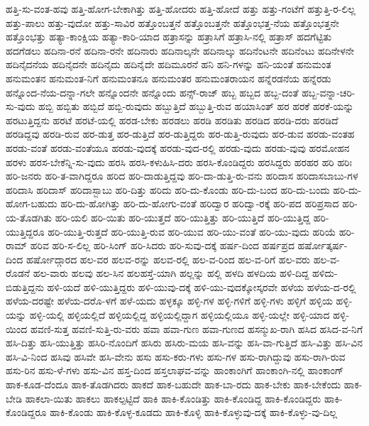 {ಹತ್ತಿ-ಸು-ವಂತ-ಹವು
ಹತ್ತಿ-ಹೋಗ-ಬೇಕಾಗಿತ್ತು
ಹತ್ತಿ-ಹೋದರು
ಹತ್ತಿ-ಹೋದೆ
ಹತ್ತು
ಹತ್ತು-ಗಂಟೆಗೆ
ಹತ್ತುತ್ತಿ-ರ-ಲಿಲ್ಲ
ಹತ್ತು-ಪಾಲು
ಹತ್ತು-ವುದೋ
ಹತ್ತು-ಸಾವಿರ
ಹತ್ತೊಂಬತ್ತನೆ
ಹತ್ತೊಂಬತ್ತನೇ
ಹತ್ತೊಂಭತ್ತ-ನೆಯ
ಹತ್ತೊಂಭತ್ತನೇ
ಹತ್ತೊಂಭತ್ತು
ಹತ್ಯಾ-ಕಾಂಕ್ಷಿಯ
ಹತ್ಯಾ-ಕಾರಿ-ಯಾದ
ಹತ್ರಾಸನ್ನು
ಹತ್ರಾಸಿಗೆ
ಹತ್ರಾಸಿ-ನಲ್ಲಿ
ಹತ್ರಾಸ್
ಹದಗೆಟ್ಟಿತು
ಹದಗೆಡಲು
ಹದಿನಾ-ರನೆ
ಹದಿನಾ-ರನೇ
ಹದಿನಾರು
ಹದಿನಾಲ್ಕನೇ
ಹದಿನಾಲ್ಕು
ಹದಿನೆಂಟನೇ
ಹದಿನೆಂಟು
ಹದಿನೇಳನೇ
ಹದಿನೈದನೆಯ
ಹದಿನೈದನೇ
ಹದಿನೈದು
ಹದಿನೈದೇ
ಹದಿಮೂರನೆ
ಹನಿ
ಹನಿ-ಗಳನ್ನು
ಹನಿ-ಯಂತೆ
ಹನುಮಂತ
ಹನುಮಂತನ
ಹನುಮಂತ-ನಿಗೆ
ಹನುಮಂತನೂ
ಹನುಮಂತರ
ಹನುಮಂತರಾಯನ
ಹನ್ನೆರಡನೆಯ
ಹನ್ನೆರಡು
ಹನ್ನೊಂದ-ನೆಯ-ದನ್ನಾ-ಗಲೇ
ಹನ್ನೊಂದನೇ
ಹನ್ನೊಂದು
ಹನ್ಸ್-ರಾಜ್
ಹಬ್ಬ
ಹಬ್ಬದ
ಹಬ್ಬ-ದಂತೆ
ಹಬ್ಬ-ವನ್ನಾ-ಚರಿ-ಸು-ವುದು
ಹಬ್ಬಿ
ಹಬ್ಬಿತು
ಹಬ್ಬಿದೆ
ಹಬ್ಬಿ-ರುವುದು
ಹಬ್ಬುತ್ತಿದೆ
ಹಬ್ಬುತ್ತಿ-ರುವ
ಹಯಾಸಿಂತ್
ಹರ
ಹರಕೆ
ಹರಕೆ-ಯನ್ನು
ಹರಟುತ್ತಿದ್ದನು
ಹರಟೆ
ಹರಟೆ-ಯಲ್ಲಿ
ಹರಡ-ಬೇಕು
ಹರಡಲು
ಹರಡಿ
ಹರಡಿತು
ಹರಡಿದ
ಹರಡಿ-ದರು
ಹರಡಿದೆ
ಹರಡಿದ್ದವು
ಹರಡಿ-ರುವ
ಹರ-ಡುತ್ತ
ಹರ-ಡುತ್ತಿದೆ
ಹರ-ಡುತ್ತಿದ್ದರು
ಹರ-ಡುತ್ತಿ-ರುವುದು
ಹರ-ಡುವ
ಹರಡು-ವಂತಹ
ಹರಡು-ವಂತೆ
ಹರಡು-ವಂತೆಯೂ
ಹರಡು-ವುದಕ್ಕೆ
ಹರಡು-ವುದ-ರಲ್ಲಿ
ಹರಡು-ವುದು
ಹರಡು-ವುವು
ಹರಮೋಹನ
ಹರಳು
ಹರಸ-ಬೇಕೆನ್ನಿ-ಸು-ವುದು
ಹರಸಿ
ಹರಸಿ-ಕಳುಹಿಸಿ-ದರು
ಹರಸಿ-ಕೊಂಡಿದ್ದರು
ಹರಸಿದ್ದರು
ಹರಹರ
ಹರಿ
ಹರಿಃ
ಹರಿ-ಜನರು
ಹರಿ-ತ-ವಾಗಿದ್ದರೂ
ಹರಿದ
ಹರಿ-ದಾಡುತ್ತಿದ್ದವು
ಹರಿ-ದಾ-ಡುತ್ತಿ-ರು-ವನು
ಹರಿದಾಸ
ಹರಿದಾಸಬಾಬು-ಗಳ
ಹರಿದಾಸಿ
ಹರಿದಾಸ್
ಹರಿದಾಸ್ಬಾಬು
ಹರಿ-ದಿತ್ತು
ಹರಿದು
ಹರಿ-ದು-ಕೊಂಡು
ಹರಿ-ದು-ಬಂದ
ಹರಿ-ದು-ಬಂದು
ಹರಿ-ದು-ಹೋಗ-ಬಹುದು
ಹರಿ-ದು-ಹೋಗಿತ್ತು
ಹರಿ-ದು-ಹೋಗು-ವಂತೆ
ಹರಿದ್ವಾರ
ಹರಿದ್ವಾ-ರಕ್ಕೆ
ಹರಿ-ಪದ
ಹರಿಪ್ರಸಾದ
ಹರಿ-ಯ-ತೊಡಗಿತು
ಹರಿ-ಯಲಿ
ಹರಿ-ಯಿತು
ಹರಿ-ಯುತ್ತದೆ
ಹರಿ-ಯುತ್ತಿತ್ತು
ಹರಿ-ಯುತ್ತಿದೆ
ಹರಿ-ಯುತ್ತಿದ್ದ
ಹರಿ-ಯುತ್ತಿದ್ದರೂ
ಹರಿ-ಯುತ್ತಿ-ರುತ್ತದೆ
ಹರಿ-ಯುತ್ತಿ-ರುವ
ಹರಿ-ಯುವ
ಹರಿ-ಯು-ವಂತೆ
ಹರಿ-ಯು-ವುದು
ಹರಿಯೆ
ಹರಿ-ರಾಮ್
ಹರಿವ
ಹರಿ-ಸ-ಲಿಲ್ಲ
ಹರಿ-ಸಿಂಗ್
ಹರಿ-ಸಿದರು
ಹರಿ-ಸುವು-ದಕ್ಕೆ
ಹರ್ಷ-ದಿಂದ
ಹರ್ಷಪ್ರದ
ಹರ್ಷೋತ್ಕರ್ಷ-ದಿಂದ
ಹರ್ಷೋದ್ಗಾರದ
ಹಲ-ವರ
ಹಲವ-ರನ್ನು
ಹಲವ-ರಲ್ಲಿ
ಹಲ-ವ-ರಿಂದ
ಹಲ-ವ-ರಿಗೆ
ಹಲ-ವರು
ಹಲ-ವ-ರೊಡನೆ
ಹಲ-ವಾರು
ಹಲವು
ಹಲ-ಸಿನ
ಹಲಹಸ್ತೆ-ಯಾಗಿ
ಹಲ್ಲನ್ನು
ಹಲ್ಲಿ
ಹಳದಿ
ಹಳದಿಯ
ಹಳಿ-ದಿದ್ದ
ಹಳಿದು-ಬಿಡುತ್ತಿದ್ದನು
ಹಳಿ-ಯದೆ
ಹಳಿ-ಯುತ್ತಿದ್ದರು
ಹಳಿ-ಯುವು-ದಕ್ಕೆ
ಹಳಿ-ಯು-ವುದಕ್ಕೋಸ್ಕರವೇ
ಹಳೆಯ
ಹಳೆಯ-ದ-ರಲ್ಲಿ
ಹಳೆಯ-ದರಷ್ಟೇ
ಹಳೆಯ-ದರೊ-ಳಗೆ
ಹಳೆ-ಯದು
ಹಳ್ಳಕ್ಕೂ
ಹಳ್ಳಿ-ಗಳ
ಹಳ್ಳಿ-ಗಳಿಗೆ
ಹಳ್ಳಿ-ಗಳು
ಹಳ್ಳಿಗೆ
ಹಳ್ಳಿಯ
ಹಳ್ಳಿ-ಯನ್ನು
ಹಳ್ಳಿ-ಯಲ್ಲಿ
ಹಳ್ಳಿಯಲ್ಲಿದೆ
ಹಳ್ಳಿಯಲ್ಲಿದ್ದ
ಹಳ್ಳಿಯಲ್ಲಿದ್ದಾಗ
ಹಳ್ಳಿಯಲ್ಲಿಯೂ
ಹಳ್ಳಿ-ಯಲ್ಲೇ
ಹಳ್ಳಿ-ಯಾದ
ಹಳ್ಳಿ-ಯಿಂದ
ಹವಣಿ-ಸುತ್ತ
ಹವಣಿ-ಸುತ್ತಿ-ರು-ವರು
ಹವಾ
ಹವಾ-ಗುಣ
ಹವಾ-ಗುಣದ
ಹಸನ್ಮುಖ-ರಾಗಿ
ಹಸಿದ
ಹಸಿದ-ವ-ನಿಗೆ
ಹಸಿ-ದಿತ್ತು
ಹಸಿ-ಯುತ್ತಿತ್ತು
ಹಸಿರಿ-ನೊಂದಿಗೆ
ಹಸಿರು
ಹಸಿರು-ಮಯ
ಹಸಿ-ವನ್ನು
ಹಸಿ-ವಾ-ಗುತ್ತಿದೆ
ಹಸಿ-ವಿತ್ತು
ಹಸಿ-ವಿನ
ಹಸಿ-ವಿ-ನಿಂದ
ಹಸಿವು
ಹಸಿವೇ
ಹಸಿ-ವೇನು
ಹಸು
ಹಸು-ಕರು-ಗಳು
ಹಸು-ಗಳ
ಹಸು-ರಾಗಿದ್ದುವು
ಹಸು-ರಾಗಿ-ರುವ
ಹಸು-ರಿನ
ಹಸು-ಳೆ-ಗಳು
ಹಸು-ವಿನ
ಹಸ್ತ-ದಿಂದ
ಹಸ್ತಲಾಘವ-ವನ್ನು
ಹಾಂಕಾಂಗಿಗೆ
ಹಾಂಕಾಂಗಿ-ನಲ್ಲಿ
ಹಾಂಕಾಂಗ್
ಹಾಕ-ಕೂಡ-ದೆಂದೂ
ಹಾಕ-ತೊಡಗಿದರು
ಹಾಕದೆ
ಹಾಕ-ಬಹುದೇ
ಹಾಕ-ಬಾ-ರದು
ಹಾಕ-ಬೇಕು
ಹಾಕ-ಬೇಕೆಂದು
ಹಾಕ-ಬೇಡಿ
ಹಾಕಲಾ-ಯಿತು
ಹಾಕಲು
ಹಾಕಲ್ಪಟ್ಟಿದೆ
ಹಾಕಿ
ಹಾಕಿ-ಕೊಂಡಿತ್ತು
ಹಾಕಿ-ಕೊಂಡಿದ್ದ
ಹಾಕಿ-ಕೊಂಡಿದ್ದರು
ಹಾಕಿ-ಕೊಂಡಿದ್ದರೂ
ಹಾಕಿ-ಕೊಂಡು
ಹಾಕಿ-ಕೊಳ್ಳ-ಕೂಡದು
ಹಾಕಿ-ಕೊಳ್ಳಿ
ಹಾಕಿ-ಕೊಳ್ಳುವು-ದಕ್ಕೆ
ಹಾಕಿ-ಕೊಳ್ಳು-ವು-ದಿಲ್ಲ
}
